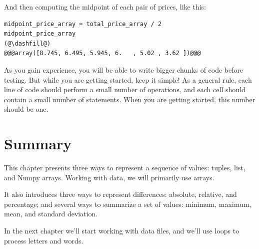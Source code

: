 And then computing the midpoint of each pair of prices, like this:

\begin{lstlisting}[]
midpoint_price_array = total_price_array / 2
midpoint_price_array
(@\dashfill@)
@@@array([8.745, 6.495, 5.945, 6.   , 5.02 , 3.62 ])@@@
\end{lstlisting}

As you gain experience, you will be able to write bigger chunks of code
before testing. But while you are getting started, keep it simple! As a
general rule, each line of code should perform a small number of
operations, and each cell should contain a small number of statements.
When you are getting started, this number should be one.

\hypertarget{summary}{%
\section{Summary}\label{summary}}

This chapter presents three ways to represent a sequence of values:
tuples, list, and Numpy arrays. Working with data, we will primarily use
arrays.

It also introduces three ways to represent differences: absolute,
relative, and percentage; and several ways to summarize a set of values:
minimum, maximum, mean, and standard deviation.

In the next chapter we'll start working with data files, and we'll use
loops to process letters and words.

